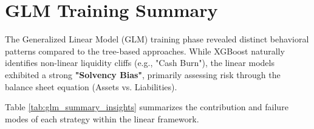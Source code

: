 \documentclass{report}\usepackage[]{graphicx}\usepackage[]{xcolor}
\begin{document}

\section{GLM Training Summary}

The Generalized Linear Model (GLM) training phase revealed distinct behavioral patterns compared to the tree-based approaches. While XGBoost naturally identifies non-linear liquidity cliffs (e.g., "Cash Burn"), the linear models exhibited a strong \textbf{"Solvency Bias"}, primarily assessing risk through the balance sheet equation (Assets vs. Liabilities).

Table \ref{tab:glm_summary_insights} summarizes the contribution and failure modes of each strategy within the linear framework.
\end{document}
